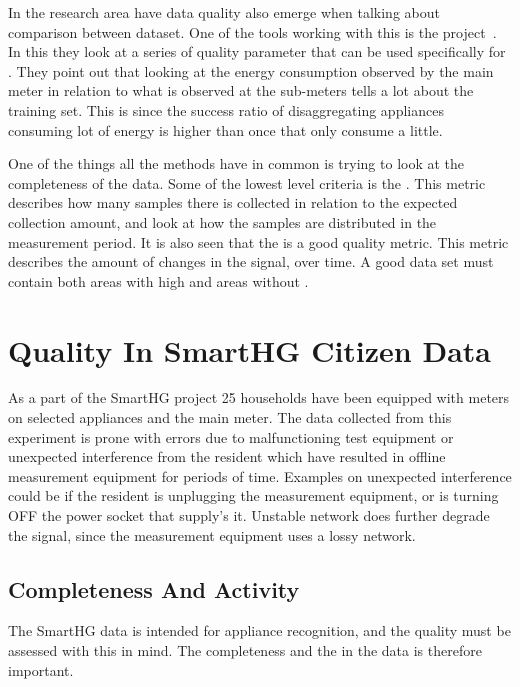 In the  research area have data quality also emerge when talking about comparison between dataset. One of the tools working with this is the  project~\citep{RefWorks:21}. In this they look at a series of quality parameter that can be used specifically for . They point out that looking at the energy consumption observed by the main meter in relation to what is observed at the sub-meters tells a lot about the training set. This is since the success ratio of disaggregating appliances consuming lot of energy is higher than once that only consume a little. 

One of the things all the methods have in common is trying to look at the completeness of the data. Some of the lowest level criteria is the . This metric describes how many samples there is collected in relation to the expected collection amount, and look at how the samples are distributed in the measurement period. It is also seen that the  is a good quality metric. This metric describes the amount of changes in the signal, over time. A good data set must contain both areas with high  and areas without . 

\newpage

\section{Quality In SmartHG Citizen Data}
As a part of the SmartHG project 25 households have been equipped with meters on selected appliances and the main meter. The data collected from this experiment is prone with errors due to malfunctioning test equipment or unexpected interference from the resident which have resulted in offline measurement equipment for periods of time. Examples on unexpected interference could be if the resident is unplugging the measurement equipment, or is turning OFF the power socket that supply's it. Unstable network does further degrade the signal, since the measurement equipment uses a lossy network. 

\subsection{Completeness And Activity}
The SmartHG data is intended for appliance recognition, and the quality must be assessed with this in mind. The completeness and the  in the data is therefore important. 

